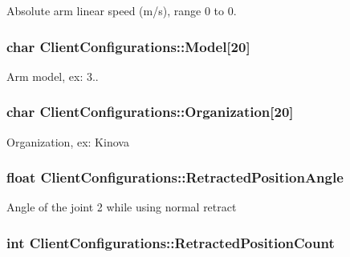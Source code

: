 Absolute arm linear speed (m/s), range 0 to 0. \hypertarget{struct_client_configurations_a7fe79480a20eea089303d95b615ae807}{
\subsubsection[{Model}]{\setlength{\rightskip}{0pt plus 5cm}char Client\-Configurations\-::\-Model\mbox{[}20\mbox{]}}}\label{struct_client_configurations_a7fe79480a20eea089303d95b615ae807}
Arm model, ex\-: 3.. \hypertarget{struct_client_configurations_a6c2d5ccc0c22fcf0a622ed00cb00b707}{
\subsubsection[{Organization}]{\setlength{\rightskip}{0pt plus 5cm}char Client\-Configurations\-::\-Organization\mbox{[}20\mbox{]}}}\label{struct_client_configurations_a6c2d5ccc0c22fcf0a622ed00cb00b707}
Organization, ex\-: Kinova \hypertarget{struct_client_configurations_ad7d6245d4683b6e31d0438466ea6bb80}{
\subsubsection[{Retracted\-Position\-Angle}]{\setlength{\rightskip}{0pt plus 5cm}float Client\-Configurations\-::\-Retracted\-Position\-Angle}}\label{struct_client_configurations_ad7d6245d4683b6e31d0438466ea6bb80}
Angle of the joint 2 while using normal retract \hypertarget{struct_client_configurations_a4058c290c5bac0504e511f0f50e5914b}{
\subsubsection[{Retracted\-Position\-Count}]{\setlength{\rightskip}{0pt plus 5cm}int Client\-Configurations\-::\-Retracted\-Position\-Count}}\label{struct_client_configurations_a4058c290c5bac0504e511f0f50e5914b}
